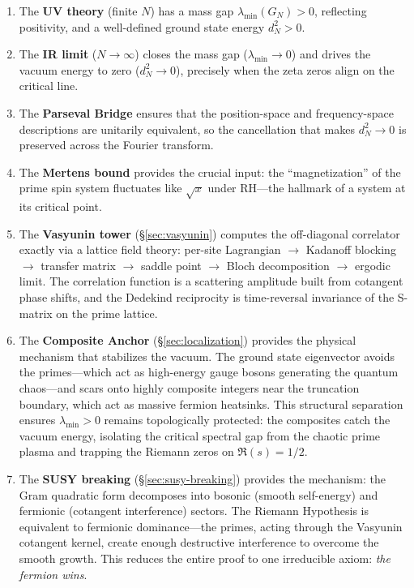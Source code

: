 \documentclass[11pt,a4paper]{article}
\begin{document}
\begin{enumerate}
  \item The \textbf{UV theory} (finite $N$) has a mass gap
    $\lambda_{\min}(G_N) > 0$, reflecting positivity, and a well-defined
    ground state energy $d_N^2 > 0$.

  \item The \textbf{IR limit} ($N \to \infty$) closes the mass gap
    ($\lambda_{\min} \to 0$) and drives the vacuum energy to zero
    ($d_N^2 \to 0$), precisely when the zeta zeros align on the
    critical line.

  \item The \textbf{Parseval Bridge} ensures that the position-space
    and frequency-space descriptions are unitarily equivalent, so the
    cancellation that makes $d_N^2 \to 0$ is preserved across the
    Fourier transform.

  \item The \textbf{Mertens bound} provides the crucial input: the
    ``magnetization'' of the prime spin system fluctuates like
    $\sqrt{x}$ under RH---the hallmark of a system at its critical
    point.

  \item The \textbf{Vasyunin tower} (\S\ref{sec:vasyunin}) computes the
    off-diagonal correlator exactly via a lattice field theory:
    per-site Lagrangian $\to$ Kadanoff blocking $\to$ transfer matrix
    $\to$ saddle point $\to$ Bloch decomposition $\to$ ergodic limit.
    The correlation function is a scattering amplitude built from
    cotangent phase shifts, and the Dedekind reciprocity is time-reversal
    invariance of the S-matrix on the prime lattice.

  \item The \textbf{Composite Anchor} (\S\ref{sec:localization})
    provides the physical mechanism that stabilizes the vacuum.
    The ground state eigenvector avoids the primes---which act as
    high-energy gauge bosons generating the quantum chaos---and
    scars onto highly composite integers near the truncation boundary,
    which act as massive fermion heatsinks.
    This structural separation ensures $\lambda_{\min} > 0$ remains
    topologically protected: the composites catch the vacuum energy,
    isolating the critical spectral gap from the chaotic prime plasma
    and trapping the Riemann zeros on $\Re(s) = 1/2$.

  \item The \textbf{SUSY breaking} (\S\ref{sec:susy-breaking}) provides
    the mechanism: the Gram quadratic form decomposes into bosonic
    (smooth self-energy) and fermionic (cotangent interference)
    sectors. The Riemann Hypothesis is equivalent to fermionic
    dominance---the primes, acting through the Vasyunin cotangent
    kernel, create enough destructive interference to overcome the
    smooth growth. This reduces the entire proof to one irreducible
    axiom: \emph{the fermion wins}.


\end{enumerate}
\end{document}

